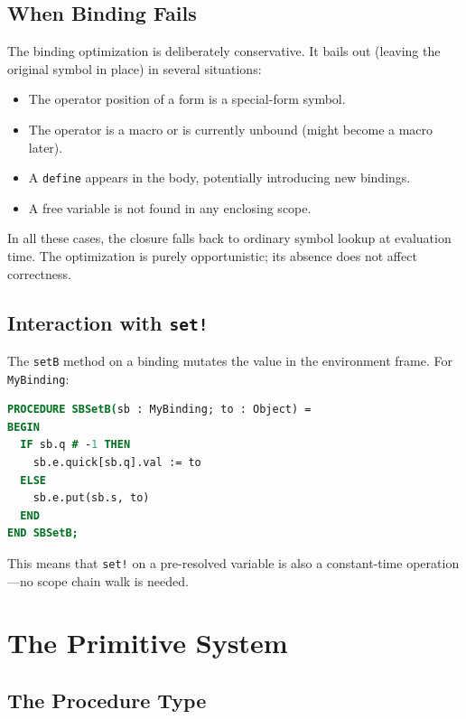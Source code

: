 \documentclass[12pt]{report}
\begin{document}
\section{When Binding Fails}

The binding optimization is deliberately conservative.  It bails out
(leaving the original symbol in place) in several situations:

\begin{itemize}
\item The operator position of a form is a special-form symbol.
\item The operator is a macro or is currently unbound (might become
  a macro later).
\item A \texttt{define} appears in the body, potentially introducing
  new bindings.
\item A free variable is not found in any enclosing scope.
\end{itemize}

In all these cases, the closure falls back to ordinary symbol lookup
at evaluation time.  The optimization is purely opportunistic; its
absence does not affect correctness.

\section{Interaction with \texttt{set!}}

The \texttt{setB} method on a binding mutates the value in the
environment frame.  For \texttt{MyBinding}:

\begin{lstlisting}[language=Modula3]
PROCEDURE SBSetB(sb : MyBinding; to : Object) =
BEGIN
  IF sb.q # -1 THEN
    sb.e.quick[sb.q].val := to
  ELSE
    sb.e.put(sb.s, to)
  END
END SBSetB;
\end{lstlisting}

This means that \texttt{set!} on a pre-resolved variable is also
a constant-time operation---no scope chain walk is needed.

\chapter{The Primitive System}
\label{ch:primitives}

\section{The Procedure Type}
\end{document}

